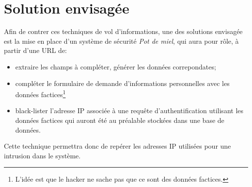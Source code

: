 \section{Solution envisagée}
Afin de contrer ces techniques de vol d'informations, une des solutions 
envisagée est la mise en place d'un  système de sécurité 
\emph{Pot de miel}, qui aura pour rôle, à partir d'une URL de:
\begin{itemize}
	\item extraire les champs à compléter, générer les données 
		correpondates;
	\item compléter le formulaire de demande
		d'informations personnelles 
		avec les données factices\footnote{L'idée est que le hacker 
		ne sache pas que ce sont des données factices.}
	\item black-lister l'adresse IP associée à une requête 
		d'authentification utilisant les données factices qui auront 
		été  au préalable stockées		dans une base de données.
\end{itemize}

Cette technique permettra donc de repérer les adresses IP utilisées pour 
une intrusion  dans le système.
